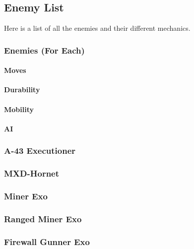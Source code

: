 \documentclass[12pt]{article}
\begin{document}
\subsection{Enemy List}

Here is a list of all the enemies and their different mechanics. 

\subsubsection{Enemies (For Each)}

\paragraph{Moves}

\paragraph{Durability}

\paragraph{Mobility}

\paragraph{AI}

\subsubsection{A-43 Executioner}

\subsubsection{MXD-Hornet}

\subsubsection{Miner Exo}

\subsubsection{Ranged Miner Exo}

\subsubsection{Firewall Gunner Exo}
\end{document}
